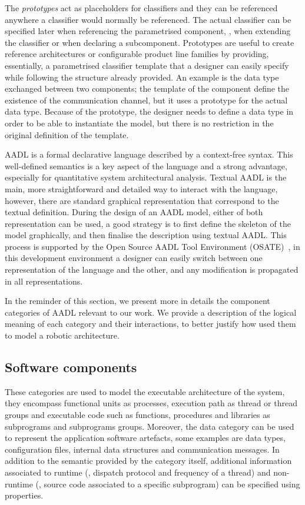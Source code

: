 The \textit{prototypes} act as placeholders for classifiers and they can be referenced anywhere a classifier would normally be referenced. The actual classifier can be specified later when referencing the parametrised component, \eg, when extending the classifier or when declaring a subcomponent. Prototypes are useful to create reference architectures or configurable product line families by providing, essentially, a parametrised classifier template that a designer can easily specify while following the structure already provided. An example is the data type exchanged between two components; the template of the component define the existence of the communication channel, but it uses a prototype for the actual data type. Because of the prototype, the designer needs to define a data type in order to be able to instantiate the model, but there is no restriction in the original definition of the template.

AADL is a formal declarative language described by a context-free syntax. This well-defined semantics is a key aspect of the language and a strong advantage, especially for quantitative system architectural analysis. Textual AADL is the main, more straightforward and detailed way to interact with the language, however, there are standard graphical representation that correspond to the textual definition. During the design of an AADL model, either of both representation can be used, a good strategy is to first define the skeleton of the model graphically, and then finalise the description using textual AADL. This process is supported by the Open Source AADL Tool Environment (OSATE)~\cite{feiler2004open}, in this development environment a designer can easily switch between one representation of the language and the other, and any modification is propagated in all representations.

In the reminder of this section, we present more in details the component categories of AADL relevant to our work. We provide a description of the logical meaning of each category and their interactions, to better justify how used them to model a robotic architecture.

\subsection{Software components}
These categories are used to model the executable architecture of the system, they encompass functional units as processes, execution path as thread or thread groups and executable code such as functions, procedures and libraries as subprograms and subprograms groups. Moreover, the data category can be used to represent the application software artefacts, some examples are data types, configuration files, internal data structures and communication messages. In addition to the semantic provided by the category itself, additional information associated to runtime (\eg, dispatch protocol and frequency of a thread) and non-runtime (\eg, source code associated to a specific subprogram) can be specified using properties.

